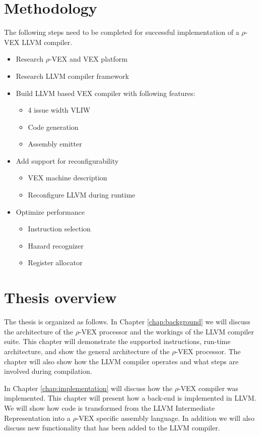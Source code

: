 \section{Methodology}
The following steps need to be completed for successful implementation of a $\rho$-VEX LLVM compiler.
\begin{itemize}
	\item Research $\rho$-VEX and VEX platform
	\item Research LLVM compiler framework
	\item Build LLVM based VEX compiler with following features:
	\begin{itemize}
		\item 4 issue width VLIW
		\item Code generation
		\item Assembly emitter
	\end{itemize}
	\item Add support for reconfigurability
		\begin{itemize}
			\item VEX machine description
			\item Reconfigure LLVM during runtime
		\end{itemize}	
	\item Optimize performance
	\begin{itemize}
		\item Instruction selection
		\item Hazard recognizer
		\item Register allocator
	\end{itemize}	
\end{itemize}




\section{Thesis overview}
The thesis is organized as follows. 
In Chapter \ref{chap:background} we will discuss the architecture of the $\rho$-VEX processor and the workings of the LLVM compiler suite. This chapter will demonstrate the supported instructions, run-time architecture, and show the general architecture of the $\rho$-VEX processor. The chapter will also show how the LLVM compiler operates and what steps are involved during compilation.

In Chapter \ref{chap:implementation} will discuss how the $\rho$-VEX compiler was implemented.  This chapter will present how a back-end is implemented in LLVM. We will show how code is transformed from the LLVM Intermediate Representation into a $\rho$-VEX specific assembly language. In addition we will also discuss new functionality that has been added to the LLVM compiler.

